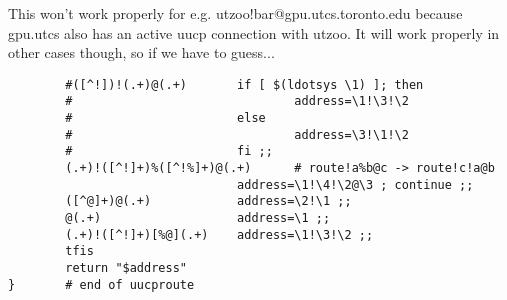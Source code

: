 This won't work properly for e.g. utzoo!bar@gpu.utcs.toronto.edu
because gpu.utcs also has an active uucp connection with utzoo.
It will work properly in other cases though, so if we have to guess...

\begin{verbatim}
        #([^!])!(.+)@(.+)       if [ $(ldotsys \1) ]; then
        #                               address=\1!\3!\2
        #                       else
        #                               address=\3!\1!\2
        #                       fi ;;
        (.+)!([^!]+)%([^!%]+)@(.+)      # route!a%b@c -> route!c!a@b
                                address=\1!\4!\2@\3 ; continue ;;
        ([^@]+)@(.+)            address=\2!\1 ;;
        @(.+)                   address=\1 ;;
        (.+)!([^!]+)[%@](.+)    address=\1!\3!\2 ;;
        tfis
        return "$address"
}       # end of uucproute
\end{verbatim}
